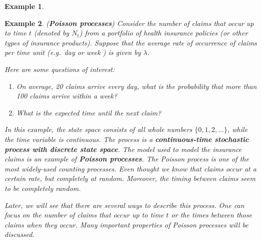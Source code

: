 \documentclass[
]{book}
\theoremstyle{definition}
\theoremstyle{definition}
\newtheorem{example}{Example}[chapter]
\theoremstyle{definition}
\theoremstyle{definition}
\theoremstyle{remark}
\begin{document}
\begin{example}
\protect\hypertarget{exm:unlabeled-div-2}{}\label{exm:unlabeled-div-2}

\textbf{Example 2}. \emph{(\textbf{Poisson processes}) Consider the number of claims
that occur up to time \(t\) (denoted by \(N_t\)) from a portfolio of health
insurance policies (or other types of insurance products). Suppose that
the average rate of occurrence of claims per time unit (e.g.~day or week
) is given by \(\lambda\).}

\emph{Here are some questions of interest:}

\begin{enumerate}
\def\labelenumi{\arabic{enumi}.}
\item
  \emph{On average, 20 claims arrive every day, what is the probability
  that more than 100 claims arrive within a week?}
\item
  \emph{What is the expected time until the next claim?}
\end{enumerate}

\emph{In this example, the state space consists of all whole numbers
\(\{0, 1, 2, \ldots\}\), while the time variable is continuous. The
process is a \textbf{continuous-time stochastic process with discrete state
space}. The model used to model the insurance claims is an example of
\textbf{Poisson processes}. The Poisson process is one of the most
widely-used counting processes. Even thought we know that claims occur
at a certain rate, but completely at random. Moreover, the timing
between claims seem to be completely random.}

\emph{Later, we will see that there are several ways to describe this
process. One can focus on the number of claims that occur up to time \(t\)
or the times between those claims when they occur. Many important
properties of Poisson processes will be discussed.}

\end{example}
\end{document}
